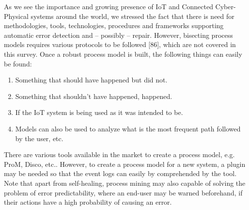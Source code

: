 As we see the importance and growing presence of IoT and Connected Cyber-Physical systems around the world, we stressed the fact that there is need for methodologies, tools, technologies, procedures and frameworks supporting automatic error detection and – possibly – repair.  However, bisecting process models requires various protocols to be followed [86], which are not covered in this survey. Once a robust process model is built, the following things can easily be found:

\begin{enumerate}
	\item Something that should have happened but did not.
	\item Something that shouldn’t have happened, happened.
	\item If the IoT system is being used as it was intended to be.
	\item Models can also be used to analyze what is the most frequent path followed by the user, etc.
\end{enumerate}

There are various tools available in the market to create a process model, e.g. ProM, Disco, etc.. However, to create a process model for a new system, a plugin may be needed so that the event logs can easily by comprehended by the tool. Note that apart from self-healing, process mining may also capable of solving the problem of error predictability, where an end-user may be warned beforehand, if their actions have a high probability of causing an error.
